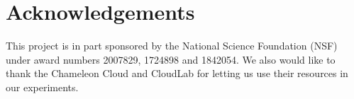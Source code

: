 \documentclass[conference]{IEEEtran}
\begin{document}
\section*{Acknowledgements}
This project is in part sponsored by the National Science Foundation (NSF) under award numbers 2007829, 1724898 and 1842054. We also would like to thank the Chameleon Cloud and CloudLab for letting us use their resources in our experiments.



\end{document}
